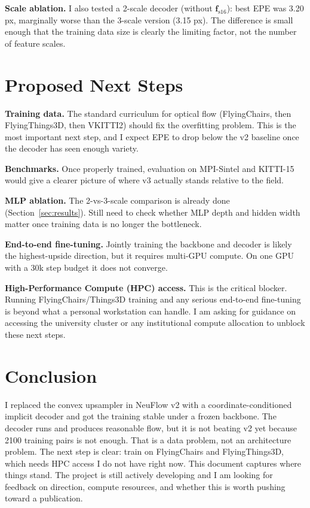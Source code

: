 \documentclass[conference]{IEEEtran}
\begin{document}
\textbf{Scale ablation.} I also tested a 2-scale decoder (without $\mathbf{f}_{\text{s16}}$): best EPE was 3.20 px, marginally worse than the 3-scale version (3.15 px). The difference is small enough that the training data size is clearly the limiting factor, not the number of feature scales.

\section{Proposed Next Steps}

\textbf{Training data.} The standard curriculum for optical flow (FlyingChairs, then FlyingThings3D, then VKITTI2) should fix the overfitting problem. This is the most important next step, and I expect EPE to drop below the v2 baseline once the decoder has seen enough variety.

\textbf{Benchmarks.} Once properly trained, evaluation on MPI-Sintel and KITTI-15 would give a clearer picture of where v3 actually stands relative to the field.

\textbf{MLP ablation.} The 2-vs-3-scale comparison is already done (Section~\ref{sec:results}). Still need to check whether MLP depth and hidden width matter once training data is no longer the bottleneck.

\textbf{End-to-end fine-tuning.} Jointly training the backbone and decoder is likely the highest-upside direction, but it requires multi-GPU compute. On one GPU with a 30k step budget it does not converge.

\textbf{High-Performance Compute (HPC) access.} This is the critical blocker. Running FlyingChairs/Things3D training and any serious end-to-end fine-tuning is beyond what a personal workstation can handle. I am asking for guidance on accessing the university cluster or any institutional compute allocation to unblock these next steps.

\section{Conclusion}

I replaced the convex upsampler in NeuFlow v2 with a coordinate-conditioned implicit decoder and got the training stable under a frozen backbone. The decoder runs and produces reasonable flow, but it is not beating v2 yet because 2100 training pairs is not enough. That is a data problem, not an architecture problem. The next step is clear: train on FlyingChairs and FlyingThings3D, which needs HPC access I do not have right now. This document captures where things stand. The project is still actively developing and I am looking for feedback on direction, compute resources, and whether this is worth pushing toward a publication.
\end{document}
